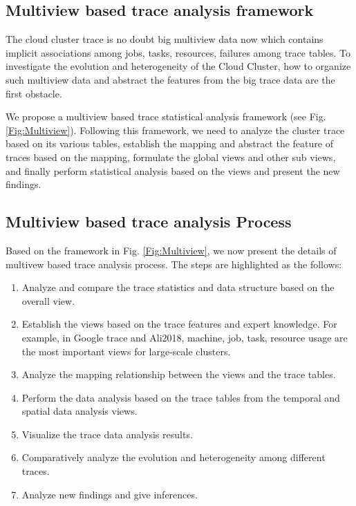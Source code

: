 \documentclass[conference]{IEEEtran}
\begin{document}
\subsection{Multiview based trace analysis framework }\label{sec:MultiviewFramework}
The  cloud  cluster  trace  is  no  doubt  big  multiview data  now which contains implicit associations among jobs, tasks, resources, failures among trace tables. To investigate the  evolution and heterogeneity of the Cloud Cluster, how to organize such multiview data and abstract the features from the big trace data are the first obstacle.


We propose a multiview based trace statistical analysis framework (see Fig. \ref{Fig:Multiview}). Following this framework, we need to analyze the cluster trace based on its various tables, establish the mapping and abstract the feature of traces based on the mapping, formulate the global views and other sub views, and finally perform statistical analysis based on the views and present the new findings.

\subsection{Multiview based trace analysis Process }\label{sec:MultiviewProcess}
Based on the framework in Fig. \ref{Fig:Multiview}, we now present the details of multivew based trace analysis process. The steps  are highlighted as the follows:
\begin{enumerate}
  \item  Analyze and compare the trace statistics and data structure based on the overall view.
  \item Establish the views based on the trace features and expert knowledge. For example, in Google trace and Ali2018, machine, job, task, resource usage are the most important views for large-scale clusters.
  \item Analyze the mapping relationship between the views and the trace tables. \label{Process: maprelationship}
  \item Perform the data analysis based on the trace tables from the temporal and spatial data analysis views.\label{Process: dataanalysis}
  \item Visualize the trace  data analysis results. \label{Process:visualizing}
   \item Comparatively analyze the evolution and heterogeneity among different traces.
  \item Analyze new findings and give inferences.
 \label{Process:findings}
 \end{enumerate}
\end{document}
